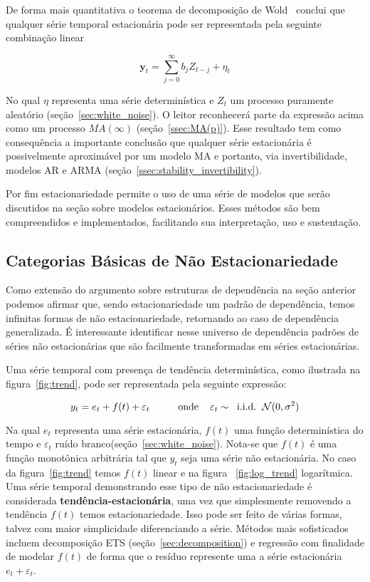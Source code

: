 De forma mais quantitativa o teorema de decomposição de Wold~\cite{chatfield}
conclui que qualquer série temporal estacionária pode ser representada pela
seguinte combinação linear

$$\mathbf{y}_t = \sum_{j=0}^\infty b_j Z_{t-j} + \eta_t$$

No qual $\eta$ representa uma série determinística e $Z_t$ um processo
puramente aleatório (seção~\ref{sec:white_noise}). O leitor reconhecerá parte da expressão
acima como um processo $MA(\infty)$ (seção~\ref{ssec:MA(p)}). Esse resultado tem
como consequência a importante conclusão que qualquer série estacionária é
possivelmente aproximável por um modelo MA e portanto, via invertibilidade,
modelos AR e ARMA (seção~\ref{ssec:stability_invertibility}).

Por fim estacionariedade permite o uso de uma série de modelos que serão
discutidos na seção sobre modelos estacionários. Esses métodos são bem
compreendidos e implementados, facilitando sua interpretação, uso e
sustentação.

\subsection{Categorias Básicas de Não Estacionariedade}\label{ssec:taxonomy}

Como extensão do argumento sobre estruturas de dependência na seção anterior
podemos afirmar que, sendo estacionariedade um padrão de dependência, temos
infinitas formas de não estacionariedade, retornando ao caso de dependência
generalizada. É interessante identificar nesse universo de dependência padrões
de séries não estacionárias que são facilmente transformadas em séries
estacionárias.

Uma série temporal com presença de tendência determinística, como ilustrada na
figura~\ref{fig:trend}, pode ser representada pela seguinte expressão:

$$  y_t = e_t + f(t) + \varepsilon_t  \hspace{1cm}\text{onde} \hspace{.4cm}\varepsilon_t \sim \hspace{.2cm}\text{i.i.d.} \hspace{.2cm}\mathcal{N}(0, \sigma^2)$$

Na qual $e_t$ representa uma série estacionária, $f(t)$ uma função
determinística do tempo e $\varepsilon_t$ ruído
branco(seção~\ref{sec:white_noise}). Nota-se que $f(t)$ é uma função
monotônica arbitrária tal que $y_t$ seja uma série não estacionária. No caso da
figura~\ref{fig:trend} temos $f(t)$ linear e na figura ~\ref{fig:log_trend}
logarítmica. Uma série temporal demonstrando esse tipo de não estacionariedade
é considerada \textbf{tendência-estacionária}, uma vez que simplesmente
removendo a tendência $f(t)$ temos estacionariedade. Isso pode ser feito de
várias formas, talvez com maior simplicidade diferenciando a série. Métodos
mais sofisticados incluem decomposição ETS (seção~\ref{sec:decomposition}) e
regressão com finalidade de modelar $f(t)$ de forma que o resíduo represente
uma a série estacionária $e_t + \varepsilon_t$.

